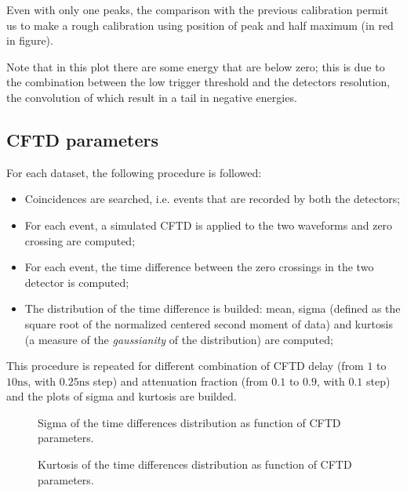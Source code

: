 \documentclass[11pt,a4 paper]{article}
\begin{document}
Even with only one peaks, the comparison with the previous calibration permit us to make a rough calibration using position of peak and half maximum (in red in figure).

Note that in this plot there are some energy that are below zero; this is due to the combination between the low trigger threshold and the detectors resolution, the convolution of which result in a tail in negative energies.

\subsection{CFTD parameters}
For each dataset, the following procedure is followed:
\begin{itemize}[noitemsep]
    \item Coincidences are searched, i.e. events that are recorded by both the detectors;
    \item For each event, a simulated CFTD is applied to the two waveforms and zero crossing are computed;
    \item For each event, the time difference between the zero crossings in the two detector is computed;
    \item The distribution of the time difference is builded: mean, sigma (defined as the square root of the normalized centered second moment of data) and kurtosis (a measure of the \emph{gaussianity} of the distribution) are computed;
\end{itemize}
This procedure is repeated for different combination of CFTD delay (from $1$ to $10\si{\nano\second}$, with $0.25\si{\nano\second}$ step) and attenuation fraction (from $0.1$ to $0.9$, with $0.1$ step) and the plots of sigma and kurtosis are builded.

\begin{figure}[H]
    \centering
    \caption{Sigma of the time differences distribution as function of CFTD parameters.}
    \label{fig:sigma2D:sim}
\end{figure}

\begin{figure}[H]
    \centering
    \caption{Kurtosis of the time differences distribution as function of CFTD parameters.}
    \label{fig:kurt:sim}
\end{figure}
\end{document}
